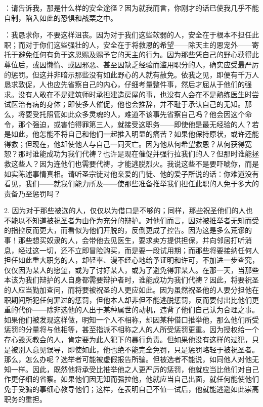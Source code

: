 ：请告诉我，那是什么样的安全途径？因为就我而言，你刚才的话已使我几乎不能自制，陷入如此的恐惧和战栗之中。\par

：我恳求你，不要这样沮丧。因为对于我们这些软弱的人，安全在于根本不担任此职；而对于你们这些强壮的人，安全在于将救恩的希望——除天主的恩宠外——寄托于避免任何有负于这恩赐及赐予它的天主的行为。因为那些凭自己的野心获得此尊位后，或因懒惰、或因邪恶、甚至因缺乏经验而滥用职分的人，确实应受最严厉的惩罚。但这并非暗示那些没有如此野心的人就有赦免。依我之见，即便有千万人恳求敦促，人也应先省察自己的内心，仔细考量整件事，然后才屈从于他们的强求。没有人敢在不是建筑师时承担建造房屋的事，也没有人会在不是熟练医生时尝试医治有病的身体；即使多人催促，他也会推辞，并不耻于承认自己的无知。那么，将要受托照管如此众多灵魂的人，难道不该事先省察自己吗？他会因这个命令，那个强迫，或害怕得罪第三人，就接受这职务——即使他是最无经验的人？若是如此，他怎能不将自己和他们一起推入明显的痛苦？如果他保持原状，或许还能得救；但现在，他却使他人与自己一同灭亡。因为他从何希望救恩？从何获得宽恕？那时谁能成功为我们代祷？也许是现在催促并强行拉我们的人？但那时谁能拯救这些人？因为连他们也需要代祷，才能逃脱烈火。我说这些不是要吓唬你，而是如实陈述事情真相。请听圣宗徒对他亲爱的门徒、他的爱子所说的话：你难道没有看见，我们——就我们能力所及——使那些准备推举我们担任此职的人免于多大的责备乃至惩罚吗？\par

2. 因为对于那些被选的人，仅仅以为借口是不够的；同样，那些祝圣他们的人也不能以不知道被祝圣者为由作为充分的辩护。对他们而言，因对被推举者无知而受的指控反而更大，而看似为他们开脱的，反倒更成了控告。因为这是多么荒谬的事！那些想买奴隶的人，会带他去见医生，要求卖方提供担保，并向邻居打听消息，经过这一切，还不立即冒险购买，而是要一段试用期；而那些将要接纳任何人担任如此重大职务的人，却轻率、漫不经心地给予证明和许可，不加进一步查究，仅仅因为某人的愿望，或为了讨好某人，或为了避免得罪某人。在那一天，当那些本该为我们辩护的人自身都需要辩护者时，谁能成功为我们代祷？因此，将要祝圣的人应当勤加查问，而将要被祝圣的人更应如此。因为虽然祝圣他的人要分担他在职期间所犯任何罪过的惩罚，但他本人却非但不能逃脱惩罚，反而要付出比他们更重的代价——除非选他的人出于某种属世的动机，违背了他们自己认为合理之事。如果他们被发现这样做，明知一个人不相称，却因某种借口推举他，那么他们所受惩罚的分量将与他相等，甚至指派不相称之人的人所受惩罚更重。因为授权给一个存心毁灭教会的人，肯定要为此人犯下的暴行负责。但如果他没有这样的过犯，只是被别人意见误导，即使如此，他也绝不能完全免罚，只是惩罚略轻于被祝圣者。那么，怎么办呢？选举者可能被虚假报告所骗。但被选者不能说，如同他人对他无知一样。因此，既然他将承受比推举他之人更严厉的惩罚，他就应当比他们对自己作更仔细的省察。如果他们因无知而强拉他，他就应当自己出面，就任何能使他们免于受骗的事细心教导他们；这样，在表明自己不值一试后，他就能逃避如此崇高职务的重担。\par

